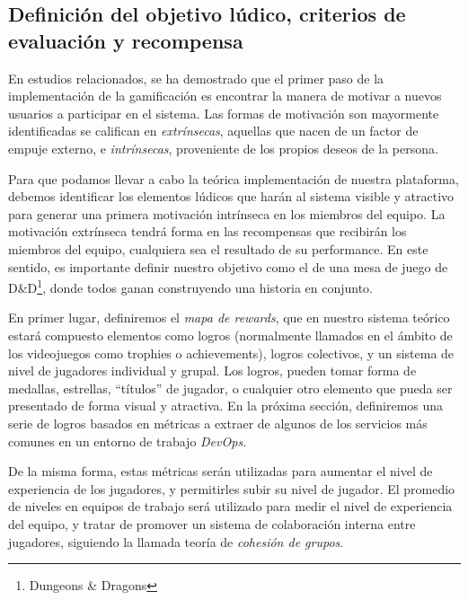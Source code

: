 \documentclass[journal]{IEEEtran}
\begin{document}
\subsection{\textbf{Definición del objetivo lúdico, criterios de evaluación y recompensa}}

En estudios relacionados, se ha demostrado que el primer paso de la implementación de la gamificación es encontrar la manera de motivar a nuevos usuarios a participar en el sistema\cite{meng2014gamification}. Las formas de motivación son mayormente identificadas se califican en \textit{extrínsecas}, aquellas que nacen de un factor de empuje externo, e \textit{intrínsecas}, proveniente de los propios deseos de la persona.

Para que podamos llevar a cabo la teórica implementación de nuestra plataforma, debemos identificar los elementos lúdicos que harán al sistema visible y atractivo para generar una primera motivación intrínseca en los miembros del equipo. La motivación extrínseca tendrá forma en las recompensas que recibirán los miembros del equipo, cualquiera sea el resultado de su performance. En este sentido, es importante definir nuestro objetivo como el de una mesa de juego de D\&D\footnote{Dungeons \& Dragons}, donde todos ganan construyendo una historia en conjunto.

En primer lugar, definiremos el \textit{mapa de rewards}, que en nuestro sistema teórico estará compuesto elementos como logros (normalmente llamados en el ámbito de los videojuegos como trophies o achievements), logros colectivos, y un sistema de nivel de jugadores individual y grupal. Los logros, pueden tomar forma de medallas, estrellas, ``títulos'' de jugador, o cualquier otro elemento que pueda ser presentado de forma visual y atractiva. En la próxima sección, definiremos una serie de logros basados en métricas a extraer de algunos de los servicios más comunes en un entorno de trabajo \textit{DevOps}.

De la misma forma, estas métricas serán utilizadas para aumentar el nivel de experiencia de los jugadores, y permitirles subir su nivel de jugador. El promedio de niveles en equipos de trabajo será utilizado para medir el nivel de experiencia del equipo, y tratar de promover un sistema de colaboración interna entre jugadores, siguiendo la llamada teoría de \textit{cohesión de grupos}\cite{mueller2024leveraging}.

\end{document}
